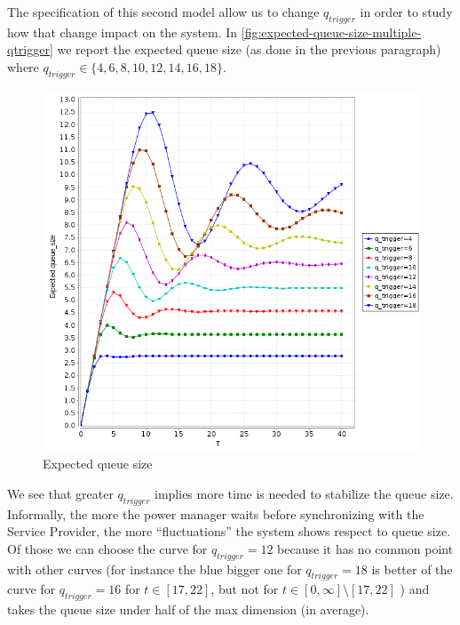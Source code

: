 The specification of this second model allow us to change
$q_{trigger}$ in order to study how that change impact on the
system. In \autoref{fig:expected-queue-size-multiple-qtrigger} we
report the expected queue size (as done in the previous paragraph)
where $q_{trigger} \in \{4,6,8,10,12,14,16,18\}$.
\begin{figure}[htb]
  \centering
  \includegraphics[width=13cm]{quantitative-project/expected-queue-size-multi-q-triggers.png}
  \caption{Expected queue size}
  \label{fig:expected-queue-size-multiple-qtrigger}
\end{figure}
We see that greater $q_{trigger}$ implies more time is needed to
stabilize the queue size. Informally, the more the power manager waits
before synchronizing with the Service Provider, the more
``fluctuations'' the system shows respect to queue size. Of those we
can choose the curve for $q_{trigger}=12$ because it has no common
point with other curves (for instance the blue bigger one for
$q_{trigger}=18$ is better of the curve for $q_{trigger} = 16$ for
$t\in[17, 22]$, but not for $t\in[0,\infty]\setminus[17, 22]$ ) and
takes the queue size under half of the max dimension (in average).

